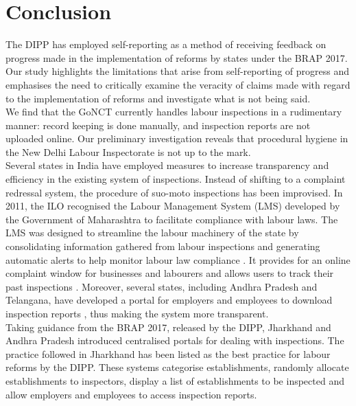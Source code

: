 \documentclass[a4paper, 12pt, twoside]{article}
\begin{document}
\section*{Conclusion}

The DIPP has employed self-reporting as a method of receiving feedback on progress made in the implementation of reforms by states under the BRAP 2017. Our study highlights the limitations that arise from self-reporting of progress and emphasises the need to critically examine the veracity of claims made with regard to the implementation of reforms and investigate what is not being said. \\

We find that the GoNCT currently handles labour inspections in a rudimentary manner: record keeping is done manually, and inspection reports are not uploaded online. Our preliminary investigation reveals that procedural hygiene in the New Delhi Labour Inspectorate is not up to the mark. \\

Several states in India have employed measures to increase transparency and efficiency in the existing system of inspections. Instead of shifting to a complaint redressal system, the procedure of suo-moto inspections has been improvised. In 2011, the ILO recognised the Labour Management System (LMS) developed by the Government of Maharashtra to facilitate compliance with labour laws. The LMS was designed to streamline the labour machinery of the state by consolidating information gathered from labour inspections and generating automatic alerts to help monitor labour law compliance \parencite{iloreport}. It provides for an online complaint window for businesses and labourers \parencite{bestpractices} and allows users to track their past inspections \parencite{mahaonline}. Moreover, several states, including Andhra Pradesh and Telangana, have developed a portal for employers and employees to download inspection reports \parencite{apgovernment}, thus making the system more transparent.\\

Taking guidance from the BRAP 2017, released by the DIPP, Jharkhand and Andhra Pradesh introduced centralised portals for dealing with inspections. The practice followed in Jharkhand has been listed as the best practice for labour reforms by the DIPP. These systems categorise establishments, randomly allocate establishments to inspectors, display a list of establishments to be inspected and allow employers and employees to access inspection reports.\\
\end{document}
